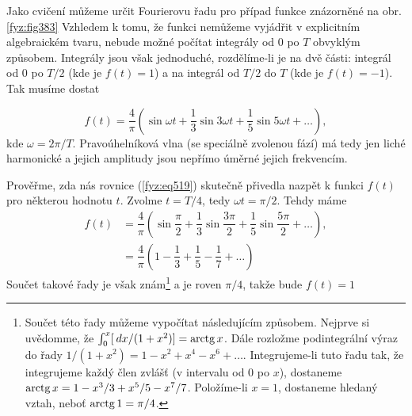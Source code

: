   Jako cvičení můžeme určit Fourierovu řadu pro případ funkce znázorněné na obr. \ref{fyz:fig383} 
  Vzhledem k tomu, že funkci nemůžeme vyjádřit v explicitním algebraickém tvaru, nebude možné 
  počítat integrály od \num{0} po \(T\) obvyklým způsobem. Integrály jsou však jednoduché, 
  rozdělíme-li je na dvě části: integrál od \num{0} po \(T/2\) (kde je \(f(t) = 1\)) a na integrál 
  od \(T/2\) do \(T\) (kde je \(f(t) = - 1\)). Tak musíme dostat
  
  \begin{equation}\label{fyz:eq519}
    f(t) = \dfrac{4}{\pi}
             \left(
                \sin\omega t + \dfrac{1}{3}\sin3\omega t + \dfrac{1}{5}\sin5\omega t + \ldots
             \right),
  \end{equation}
  kde \(\omega = 2\pi/T\). Pravoúhelníková vlna (se speciálně zvolenou fází) má tedy jen liché 
  harmonické a jejich amplitudy jsou nepřímo úměrné jejich frekvencím. 
  
  Prověřme, zda nás rovnice (\ref{fyz:eq519}) skutečně přivedla nazpět k funkci \(f(t)\) pro 
  některou hodnotu \(t\). Zvolme \(t = T/4\), tedy \(\omega t = \pi/2\). Tehdy máme
  \begin{align}\label{fyz:eq520}
    f(t) &= \dfrac{4}{\pi}
              \left(
                \sin\dfrac{\pi}{2} + \dfrac{1}{3}\sin\dfrac{3\pi}{2} + 
                \dfrac{1}{5}\sin\dfrac{5\pi}{2} + \ldots
              \right),                \nonumber \\
         &= \dfrac{4}{\pi}
              \left(
                1 - \dfrac{1}{3} + \dfrac{1}{5} - \dfrac{1}{7} + \ldots
              \right)
  \end{align}
  Součet takové řady je však znám\footnote{Součet této řady můžeme vypočítat následujícím způsobem. 
  Nejprve si uvědomme, že \(\int_0^x[\hspace{2pt}dx/(1+x^2)]=\operatorname{arctg} x\). Dále rozložme podintegrální výraz 
  do 
  řady \(1/(1+x^2) = 1 - x^2 + x^4 - x^6 + \ldots\). Integrujeme-li tuto řadu tak, že integrujeme 
  každý člen zvlášť (v intervalu od \num{0} po \(x\)), dostaneme \(\operatorname{arctg} x = 1 - x^3/3 + x^5/5 - 
  x^7/7\). Položíme-li \(x = 1\), dostaneme hledaný vztah, neboť \(\operatorname{arctg} 1 = \pi/4\).} a je roven 
  \(\pi/4\), takže bude \(f(t) = 1\)
  
